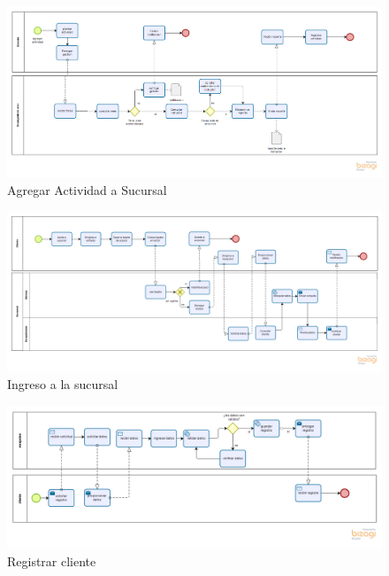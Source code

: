 	\begin{figure}[htbp]
		\begin{center}
			\includegraphics[width=1.1\textwidth]{images/Procesos/agregarActividadSucursal}
			\caption{Agregar Actividad a Sucursal}
		\end{center}
	\end{figure}

\begin{figure}[htbp]
	\begin{center}
		\includegraphics[width=1.1\textwidth]{images/Procesos/IngresarSucursal}
		\caption{Ingreso a la sucursal}
	\end{center}
\end{figure}

\begin{figure}[htbp]
	\begin{center}
		\includegraphics[width=1.1\textwidth]{images/Procesos/registrarCliente}
		\caption{Registrar cliente}
	\end{center}
\end{figure}

